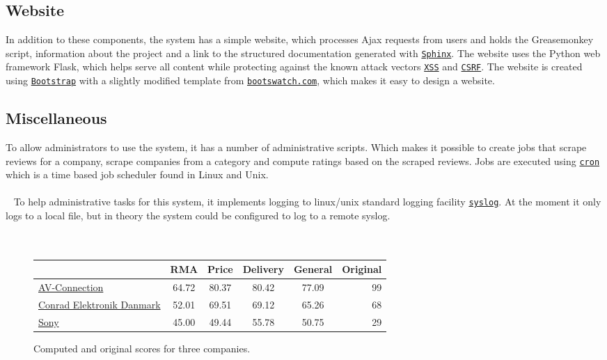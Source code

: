 \documentclass[10pt]{IEEEtran}
\begin{document}
\subsection{Website}
In addition to these components, the system has a simple website, which processes Ajax requests from users and holds the Greasemonkey script, information about the project and a link to the structured documentation generated with \href{http://sphinx-doc.org/}{\texttt{Sphinx}}. The website uses the Python web framework Flask, which helps serve all content while protecting against the known attack vectors \href{https://www.owasp.org/index.php/Cross-site_Scripting_(XSS)}{\texttt{XSS}} and \href{https://www.owasp.org/index.php/Cross-Site_Request_Forgery_(CSRF)}{\texttt{CSRF}}. The website is created using \href{http://getbootstrap.com/}{\texttt{Bootstrap}} with a slightly modified template from \href{http://bootswatch.com/flatly/}{\texttt{bootswatch.com}}, which makes it easy to design a website.

\subsection{Miscellaneous}
To allow administrators to use the system, it has a number of administrative scripts. Which makes it possible to create jobs that scrape reviews for a company, scrape companies from a category and compute ratings based on the scraped reviews. Jobs are executed using \href{http://pubs.opengroup.org/onlinepubs/009696699/utilities/crontab.html}{\texttt{cron}} which is a time based job scheduler found in Linux and Unix.
\\~
\\~
To help administrative tasks for this system, it implements logging to linux/unix standard logging facility \href{http://tools.ietf.org/html/rfc5424}{\texttt{syslog}}. At the moment it only logs to a local file, but in theory the system could be configured to log to a remote syslog.
\\~
\\~

\begin{figure*}[!ht]
	\vspace*{10mm}
	\hspace*{25mm}	
	\begin{tabular}{ | l | c | c | c | c | r | }
  		\hline
   		 & \textbf{RMA} & \textbf{Price} & \textbf{Delivery} & \textbf{General} & \textbf{Original} \\ \hline
  		\href{http://www.trustpilot.dk/review/www.av-connection.dk}{AV-Connection} & 64.72 & 80.37 & 80.42 & 77.09 & 99 \\ \hline
  		\href{http://www.trustpilot.dk/review/www.conradelektronik.dk}{Conrad Elektronik Danmark} & 52.01 & 69.51 & 69.12 & 65.26 & 68 \\ \hline
  		\href{http://www.trustpilot.dk/review/www.sony.dk}{Sony}  & 45.00 & 49.44 & 55.78 & 50.75 & 29 \\ \hline
	\end{tabular}
	\hspace*{30mm}	
	\caption{Computed and original scores for three companies. \label{fig:scores}}
\end{figure*}
\end{document}
